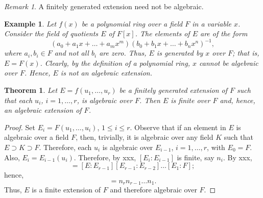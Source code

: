 \documentclass[draft]{article}
\newtheorem{thm}{Theorem}[section]
\newtheorem{exmp}{Example}
\theoremstyle{definition}
\theoremstyle{remark}
\newtheorem{rem}{Remark}[section]
\begin{document}
            \begin{rem}
                A finitely generated extension need not be algebraic.
            \end{rem}
            
             \begin{exmp}
                Let $f(x)$ be a polynomial ring over a field $F$ in a variable $x$. Consider the field of quotients $E$ of $F[x]$. The elements of $E$ are of the form
                \begin{equation*}
                    (a_0 + a_1x + \dots + a_mx^m)(b_0 + b_1x + \dots + b_nx^n)^{-1},
                \end{equation*}
                where $a_i, b_i \in F$ and not all $b_i$ are zero. Thus, $E$ is generated by $x$ over $F$; that is, $E = F(x)$. Clearly, by the definition of a polynomial ring, $x$ cannot be algebraic over $F$. Hence, $E$ is not an algebraic extension.
            \end{exmp}
            
            \begin{thm}
                Let $E = f(u_1, \dots, u_r)$ be a finitely generated extension of $F$ such that each $u_i$, $i = 1, \dots, r$, is algebraic over $F$. Then $E$ is finite over $F$ and, hence, an algebraic extension of $F$.
            \end{thm}
            
            \begin{proof}
                Set $E_i = F(u_1, \dots, u_i)$, $1 \leq i \leq r$. Observe that if an element in $E$ is algebraic over a field $F$, then, trivially, it is algebraic over any field $K$ such that $E \supset K \supset F$. Therefore, each $u_i$ is algebraic over $E_{i - 1}$, $i = 1, \dots, r$, with $E_0 = F$. Also, $E_i = E_{i - 1}(u_i)$. Therefore, by xxx, $[E_i : E_{i - 1}]$ is finite, say $n_i$. By xxx,
                \begin{equation*}
                    [E:F] = [E:E_{r - 1}][E_{r - 1}:E_{r - 2}] \dots [E_1:F];
                \end{equation*}
                hence,
                \begin{equation*}
                    [E:F] = n_rn_{r - 1} \dots n_1.
                \end{equation*}
                Thus, $E$ is a finite extension of $F$ and therefore algebraic over $F$.
            \end{proof}
            
\end{document}
